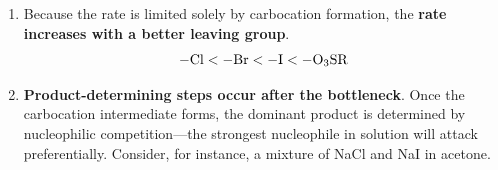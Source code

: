 \documentclass[10pt]{article}
\begin{document}
\begin{core}{\sno}
\begin{enumerate}
        \item Because the rate is limited solely by carbocation formation, the \textbf{rate increases with a better leaving group}.
        \[
          \ce{-Cl} < \ce{-Br} < \ce{-I} < \ce{-O3SR}
        \]


        \item \textbf{Product-determining steps occur after the bottleneck}. Once the carbocation intermediate forms, the dominant product is determined by nucleophilic competition---the strongest nucleophile in solution will attack preferentially. Consider, for instance, a mixture of NaCl and NaI in acetone.


\end{enumerate}
\end{core}
\end{document}
